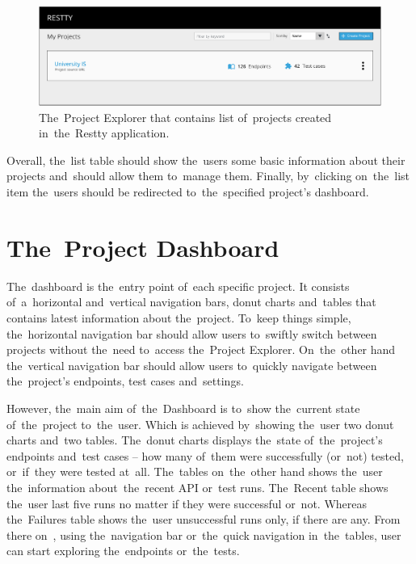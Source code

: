 \begin{figure}[!hbt]
	\centering
	\includegraphics[scale=0.55]{./designs/project-explorer.pdf}
	\caption{The~Project Explorer that contains list of~projects created
	in~the~Restty application.}
\end{figure}

Overall, the~list table should show the~users some basic information about their
projects and~should allow them to~manage them. Finally, by~clicking on~the~list
item the~users should be redirected to~the~specified project's dashboard.


\section{The~Project Dashboard}
The~dashboard is the~entry point of~each specific project. It consists
of~a~horizontal and~vertical navigation bars, donut charts and~tables that
contains latest information about the~project. To~keep things simple,
the~horizontal navigation bar should allow users to~swiftly switch between
projects without the~need to~access the~Project Explorer. On~the~other hand
the~vertical navigation bar should allow users to~quickly navigate between
the~project's endpoints, test cases and~settings.

However, the~main aim of~the~Dashboard is to~show the~current state
of~the~project to~the~user. Which is achieved by~showing the~user two donut
charts and~two tables. The~donut charts displays the~state of~the~project's
endpoints and~test cases -- how many of~them were successfully (or~not) tested,
or~if~they were tested at~all. The~tables on~the~other hand shows the~user
the~information about~the~recent API or~test runs. The~Recent table shows
the~user last five runs no matter if they were successful or~not. Whereas
the~Failures table shows the~user unsuccessful runs only, if there are any. From
there on~, using the~navigation bar or~the~quick navigation in~the~tables, user
can start exploring the~endpoints or~the~tests.

